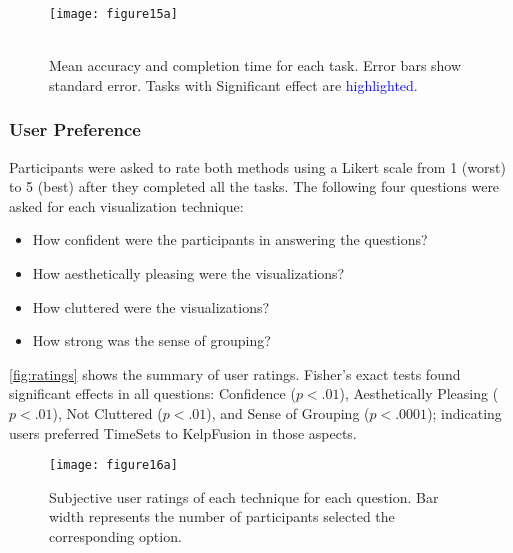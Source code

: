 \begin{figure}[!htb]
	\centering
	 {\texttt{[image: figure15a]}} \\
	\\
	\caption{Mean accuracy and completion time for each task. Error bars show standard error. Tasks with Significant effect are \textcolor{blue}{highlighted}.}
\end{figure}

\subsubsection{User Preference}
Participants were asked to rate both methods using a Likert scale from 1 (worst) to 5 (best) after they completed all the tasks. The following four questions were asked for each visualization technique:
\begin{itemize}
	\item How confident were the participants in answering the questions?
	\item How aesthetically pleasing were the visualizations?
	\item How cluttered were the visualizations?
	\item How strong was the sense of grouping?
\end{itemize}
\autoref{fig:ratings} shows the summary of user ratings. Fisher's exact tests found significant effects in all questions: Confidence ($p<.01$), Aesthetically Pleasing ($p<.01$), Not Cluttered ($p<.01$), and Sense of Grouping ($p<.0001$); indicating users preferred TimeSets to KelpFusion in those aspects.

\begin{figure}[!htb]
	\centering
	 {
		\texttt{[image: figure16a]}}
	\caption{Subjective user ratings of each technique for each question. Bar width represents the number of participants selected the corresponding option.}
	\label{fig:ratings}
\end{figure}

